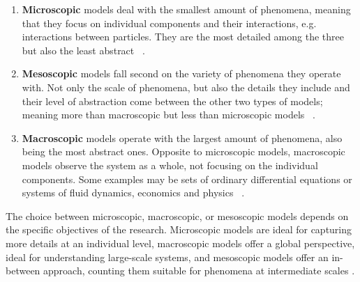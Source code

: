 \documentclass[class={myRUCProject}, crop=false]{standalone}
\begin{document}
\begin{enumerate}

    \item \textbf{Microscopic} models deal with the smallest amount of phenomena, meaning that they focus on individual components and their interactions, e.g. interactions between particles. They are the most detailed among the three but also the least abstract ~\cite{Lachowicz2011}.
    
    \item \textbf{Mesoscopic} models fall second on the variety of phenomena they operate with. Not only the scale of phenomena, but also the details they include and their level of abstraction come between the other two types of models; meaning more than macroscopic but less than microscopic models ~\cite{Lachowicz2011}.
    
    \item \textbf{Macroscopic} models operate with the largest amount of phenomena, also being the most abstract ones. Opposite to microscopic models, macroscopic models observe the system as a whole, not focusing on the individual components. Some examples may be sets of ordinary differential equations or systems of fluid dynamics, economics and physics ~\cite{Lachowicz2011}.

\end{enumerate}

The choice between microscopic, macroscopic, or mesoscopic models depends on the specific objectives of the research. Microscopic models are ideal for capturing more details at an individual level, macroscopic models offer a global perspective, ideal for understanding large-scale systems, and mesoscopic models offer an in-between approach, counting them suitable for phenomena at intermediate scales \cite{Lachowicz2011}.







\end{document}
